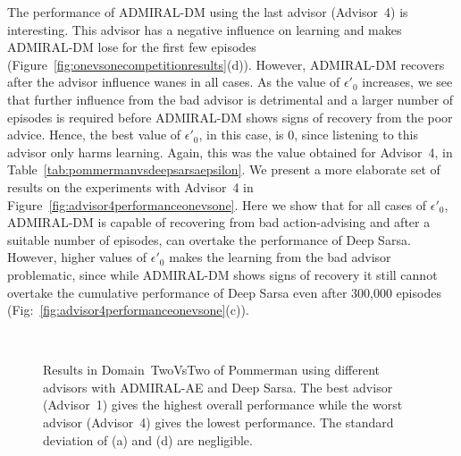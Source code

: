 \documentclass[jair, twoside,11pt,theapa]{article}
\begin{document}
The performance of ADMIRAL-DM using the last advisor (Advisor~4) is interesting. This advisor has a negative influence on learning and makes ADMIRAL-DM lose  for the first few episodes (Figure~\ref{fig:onevsonecompetitionresults}(d)). However, ADMIRAL-DM recovers after the advisor influence wanes in all cases. As the value of $\epsilon'_0$ increases, we see that further influence from the bad advisor is  detrimental and a larger number of episodes is required before ADMIRAL-DM shows signs of recovery from the poor advice. Hence, the best value of $\epsilon'_0$, in this case, is 0, since listening to this advisor only harms learning. Again, this was the value obtained for Advisor~4, in Table~\ref{tab:pommermanvsdeepsarsaepsilon}. We present a more elaborate set of results on the experiments with Advisor~4 in Figure~\ref{fig:advisor4performanceonevsone}. Here we show that for all cases of $\epsilon'_0$, ADMIRAL-DM is capable of recovering from bad action-advising and after a suitable number of episodes, can overtake the performance of Deep Sarsa. However, higher values of $\epsilon'_0$ makes the learning from the bad advisor  problematic, since while ADMIRAL-DM shows signs of recovery it still cannot overtake the cumulative performance of Deep Sarsa even after 300,000 episodes (Fig:~\ref{fig:advisor4performanceonevsone}(c)).
















\begin{figure}[h]
\centering
	\\
  \caption{Results in Domain~TwoVsTwo of Pommerman using different advisors with ADMIRAL-AE and Deep Sarsa.  The best advisor (Advisor~1) gives the highest overall performance while the worst advisor (Advisor~4) gives the lowest performance. The standard deviation of (a) and (d) are negligible.
  }%
	\label{fig:teamcompetitionoffpolicy}
\end{figure}
\end{document}
